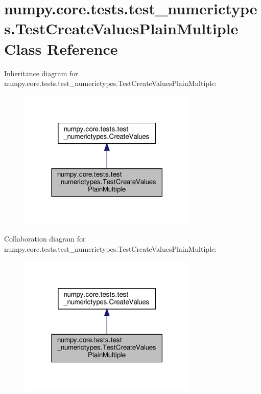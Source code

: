 \hypertarget{classnumpy_1_1core_1_1tests_1_1test__numerictypes_1_1TestCreateValuesPlainMultiple}{}\section{numpy.\+core.\+tests.\+test\+\_\+numerictypes.\+Test\+Create\+Values\+Plain\+Multiple Class Reference}
\label{classnumpy_1_1core_1_1tests_1_1test__numerictypes_1_1TestCreateValuesPlainMultiple}


Inheritance diagram for numpy.\+core.\+tests.\+test\+\_\+numerictypes.\+Test\+Create\+Values\+Plain\+Multiple\+:
\nopagebreak
\begin{figure}[H]
\begin{center}
\leavevmode
\includegraphics[width=242pt]{classnumpy_1_1core_1_1tests_1_1test__numerictypes_1_1TestCreateValuesPlainMultiple__inherit__graph}
\end{center}
\end{figure}


Collaboration diagram for numpy.\+core.\+tests.\+test\+\_\+numerictypes.\+Test\+Create\+Values\+Plain\+Multiple\+:
\nopagebreak
\begin{figure}[H]
\begin{center}
\leavevmode
\includegraphics[width=242pt]{classnumpy_1_1core_1_1tests_1_1test__numerictypes_1_1TestCreateValuesPlainMultiple__coll__graph}
\end{center}
\end{figure}
